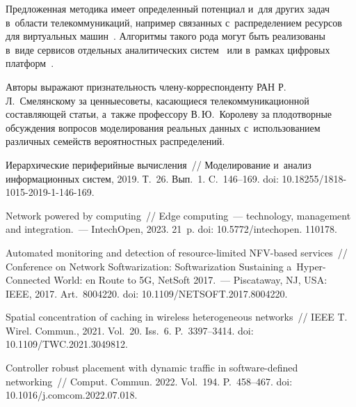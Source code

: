 \begin{multicols}{2}
Предложенная методика имеет определенный потенциал и~для других задач в~об\-ласти 
телекоммуникаций, например связанных с~рас\-пре\-де\-ле\-ни\-ем ресурсов для виртуальных 
машин~\cite{Huang2016,Tian2022}. Алгоритмы такого рода могут быть реализованы 
в~виде сервисов отдельных аналитических сис\-тем~\cite{Gorshenin2016b,Gorshenin2017b} или в~рамках циф\-ро\-вых 
плат\-форм~\cite{Gorshenin2018}.

\medskip

Авторы выражают признательность чле\-ну-кор\-рес\-пон\-ден\-ту РАН Р.\,Л.~Сме\-лян\-ско\-му за 
ценные\linebreak советы, ка\-са\-ющи\-еся телекоммуникационной со\-став\-ля\-ющей \mbox{статьи}, а~так\-же 
профессору В.\,Ю.~Королеву за пло\-до\-твор\-ные об\-суж\-де\-ния вопросов моделирования 
реальных данных с~\mbox{использованием} различных семейств вероятностных распределений.
{

}

\vspace*{-6pt}

{\small\frenchspacing
 { %
 \begin{thebibliography}{99}
\vspace*{-3pt}

 Иерархические периферийные 
вы\-чис\-ле\-ния~// Моделирование и~анализ информационных сис\-тем, 2019. Т.~26. Вып.~1.  C.~146--169.
doi: 10.18255/1818-1015-2019-1-146-169.

 Network powered by computing~// 
Edge computing~--- technology, management and integration.~--- IntechOpen, 2023. 21~p.
doi: 10.5772/\mbox{intechopen}. 110178.

 Automated monitoring and detection of resource-limited NFV-based 
services~// Conference on Network Softwarization: Softwarization 
Sustaining a~Hyper-Connected World: en Route to 5G, NetSoft 2017.~--- Piscataway, 
NJ, USA: IEEE, 2017. Art.~8004220. doi: 10.1109/NETSOFT.2017.8004220.

Spatial concentration of caching in wireless heterogeneous networks~// 
IEEE T. Wirel. Commun., 2021. Vol.~20. Iss.~6. P.~3397--3414. 
doi: 10.1109/TWC.2021.3049812.

Controller robust placement with dynamic traffic in software-defined networking~// Comput. Commun. 2022. Vol.~194. P.~458--467. 
doi: 10.1016/j.comcom.2022.07.018.


\end{thebibliography}}}
\end{multicols}
